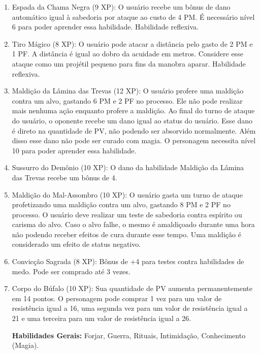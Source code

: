 \begin{enumerate}
  	\item Espada da Chama Negra (9 XP): O usuário recebe um bônus de dano automático igual à sabedoria por ataque ao custo de 4 PM. É necessário nível 6 para poder aprender essa habilidade. Habilidade reflexiva.

  	\item Tiro Mágico (8 XP): O usuário pode atacar a distância pelo gasto de 2 PM e 1 PF. A distância é igual ao dobro da acuidade em metros. Considere esse ataque como um projétil pequeno para fins da manobra aparar. Habilidade reflexiva.
    
  	\item Maldição da Lâmina das Trevas (12 XP): O usuário profere uma maldição contra um alvo, gastando 6 PM e 2 PF no processo. Ele não pode realizar mais nenhuma ação enquanto profere a maldição. Ao final do turno de ataque do usuário, o oponente recebe um dano igual ao status do usuário. Esse dano é direto na quantidade de PV, não podendo ser absorvido normalmente. Além disso esse dano não pode ser curado com magia. O personagem necessita nível 10 para poder aprender essa habilidade.

  \item Sussurro do Demônio (10 XP): O dano da habilidade Maldição da Lâmina das Trevas recebe um bônus de 4.

\item Maldição do Mal-Assombro (10 XP): O usuário gasta um turno de ataque profetizando uma maldição contra um alvo, gastando 8 PM e 2 PF no processo. O usuário deve realizar um teste de sabedoria contra espírito ou carisma do alvo. Caso o alvo falhe, o mesmo é amaldiçoado durante uma hora não podendo receber efeitos de cura durante esse tempo. Uma maldição é considerado um efeito de status negativo.

\item Convicção Sagrada (8 XP): Bônus de +4 para testes contra habilidades de medo. Pode ser comprado até 3 vezes.

\item Corpo do Búfalo (10 XP): Sua quantidade de PV aumenta permanentemente em 14 pontos. O personagem pode comprar 1 vez para um valor de resistência igual a 16, uma segunda vez para um valor de resistência igual a 21 e uma terceira para um valor de resistência igual a 26.
	

\textbf{Habilidades Gerais:} Forjar, Guerra, Rituais, Intimidação, Conhecimento (Magia).
  
\end{enumerate}


